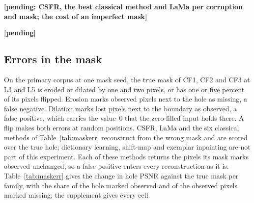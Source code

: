 \documentclass[final,3p]{elsarticle}
\newcommand{\resultpending}[1]{\textbf{[pending: #1]}}
\begin{document}
\resultpending{CSFR, the best classical method and LaMa per corruption and mask; the cost of an imperfect mask}

\begin{table}[!t]
\centering
\caption{Byte-corrupted JPEG files: hole PSNR (dB) over the pixels the oracle marks lost, per corruption and mask, over the cases whose mask leaves something to fill and something observed; CSFR's paired differences to the strongest classical method and to LaMa; and, against the oracle, the share of the lost pixels each mask marks missing (Cover) and the lost pixels it marks observed as a share of all pixels (FP).}
\label{tab:jpeg}
\footnotesize
\textbf{[pending]}
\end{table}

\subsection{Errors in the mask}
\label{sec:results:maskerr}

On the primary corpus at one mask seed, the true mask of CF1, CF2 and CF3 at L3 and L5 is eroded or dilated by one and two pixels, or has one or five percent of its pixels flipped. Erosion marks observed pixels next to the hole as missing, a false negative. Dilation marks lost pixels next to the boundary as observed, a false positive, which carries the value~0 that the zero-filled input holds there. A flip makes both errors at random positions. CSFR, LaMa and the six classical methods of Table~\ref{tab:maskerr} reconstruct from the wrong mask and are scored over the true hole; dictionary learning, shift-map and exemplar inpainting are not part of this experiment. Each of these methods returns the pixels its mask marks observed unchanged, so a false positive enters every reconstruction as it is. Table~\ref{tab:maskerr} gives the change in hole PSNR against the true mask per family, with the share of the hole marked observed and of the observed pixels marked missing; the supplement gives every cell.
\end{document}

